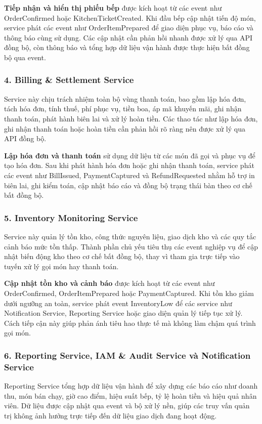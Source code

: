 \textbf{Tiếp nhận và hiển thị phiếu bếp} được kích hoạt từ các event như \textsf{OrderConfirmed} hoặc \textsf{KitchenTicketCreated}. Khi đầu bếp cập nhật tiến độ món, service phát các event như \textsf{OrderItemPrepared} để giao diện phục vụ, báo cáo và thông báo cùng sử dụng. Các cập nhật cần phản hồi nhanh được xử lý qua API đồng bộ, còn thông báo và tổng hợp dữ liệu vận hành được thực hiện bất đồng bộ qua event.

\subsubsection*{4. \textsf{Billing \& Settlement Service}}
Service này chịu trách nhiệm toàn bộ vùng thanh toán, bao gồm lập hóa đơn, tách hóa đơn, tính thuế, phí phục vụ, tiền boa, áp mã khuyến mãi, ghi nhận thanh toán, phát hành biên lai và xử lý hoàn tiền. Các thao tác như lập hóa đơn, ghi nhận thanh toán hoặc hoàn tiền cần phản hồi rõ ràng nên được xử lý qua API đồng bộ.

\textbf{Lập hóa đơn và thanh toán} sử dụng dữ liệu từ các món đã gọi và phục vụ để tạo hóa đơn. Sau khi phát hành hóa đơn hoặc ghi nhận thanh toán, service phát các event như \textsf{BillIssued}, \textsf{PaymentCaptured} và \textsf{RefundRequested} nhằm hỗ trợ in biên lai, ghi kiểm toán, cập nhật báo cáo và đồng bộ trạng thái bàn theo cơ chế bất đồng bộ.

\subsubsection*{5. \textsf{Inventory Monitoring Service}}
Service này quản lý tồn kho, công thức nguyên liệu, giao dịch kho và các quy tắc cảnh báo mức tồn thấp. Thành phần chủ yếu tiêu thụ các event nghiệp vụ để cập nhật biến động kho theo cơ chế bất đồng bộ, thay vì tham gia trực tiếp vào tuyến xử lý gọi món hay thanh toán.

\textbf{Cập nhật tồn kho và cảnh báo} được kích hoạt từ các event như \textsf{OrderConfirmed}, \textsf{OrderItemPrepared} hoặc \textsf{PaymentCaptured}. Khi tồn kho giảm dưới ngưỡng an toàn, service phát event \textsf{InventoryLow} để các service như \textsf{Notification Service}, \textsf{Reporting Service} hoặc giao diện quản lý tiếp tục xử lý. Cách tiếp cận này giúp phản ánh tiêu hao thực tế mà không làm chậm quá trình gọi món.


\subsubsection*{6. \textsf{Reporting Service}, \textsf{IAM \& Audit Service} và \textsf{Notification Service}}
\textsf{Reporting Service} tổng hợp dữ liệu vận hành để xây dựng các báo cáo như doanh thu, món bán chạy, giờ cao điểm, hiệu suất bếp, tỷ lệ hoàn tiền và hiệu quả nhân viên. Dữ liệu được cập nhật qua event và \textsf{bộ xử lý nền}, giúp các truy vấn quản trị không ảnh hưởng trực tiếp đến dữ liệu giao dịch đang hoạt động.

